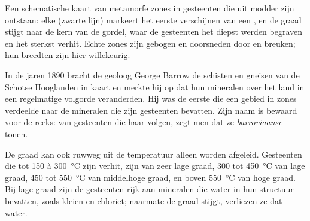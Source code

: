 \begin{omfigure}

{\small Een schematische kaart van metamorfe zones in gesteenten die uit modder zijn ontstaan: elke
 (zwarte lijn) markeert het eerste verschijnen van een , en de
graad stijgt naar de kern van de gordel, waar de gesteenten het diepst werden begraven
en het sterkst verhit. Echte zones zijn gebogen en doorsneden door  en breuken; hun
breedten zijn hier willekeurig.}
\end{omfigure}

\begin{history}
In de jaren 1890 bracht de geoloog George Barrow de schisten en gneisen van
de Schotse Hooglanden in kaart en merkte hij op dat hun mineralen over het
land in een regelmatige volgorde veranderden. Hij was de eerste die een gebied in zones verdeelde naar
de mineralen die zijn gesteenten bevatten. Zijn naam is bewaard voor de reeks: van gesteenten
die haar volgen, zegt men dat ze \emph{barroviaanse}  tonen.
\end{history}

De graad kan ook ruwweg uit de temperatuur alleen worden afgeleid. Gesteenten die tot 150
à \qty{300}{\celsius} zijn verhit, zijn van zeer lage graad, 300 tot \qty{450}{\celsius} van
lage graad, 450 tot \qty{550}{\celsius} van middelhoge graad, en boven
\qty{550}{\celsius} van hoge graad. Bij lage graad zijn de gesteenten rijk aan
mineralen die water in hun structuur bevatten, zoals kleien en chloriet; naarmate
de graad stijgt, verliezen ze dat water.


